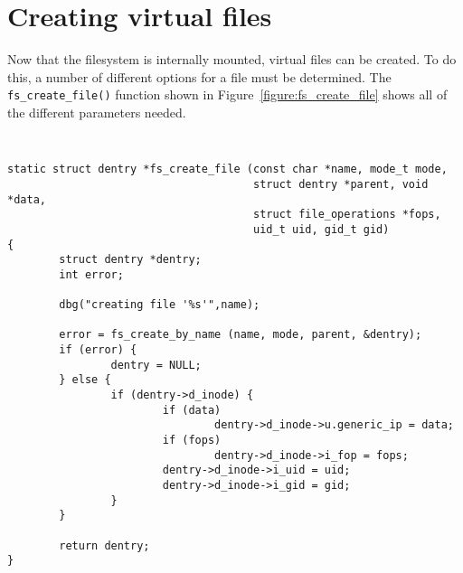 \documentclass[twocolumn]{article}
\begin{document}
\section{Creating virtual files}

Now that the filesystem is internally mounted, virtual files can be
created.  To do this, a number of different options for a file must be
determined.  The {\tt fs\_create\_file()} function shown in
Figure~\ref{figure:fs_create_file} shows all of the different parameters
needed.

\begin{figure*}[tb]
{\tt \small
\begin{verbatim}
static struct dentry *fs_create_file (const char *name, mode_t mode,
                                      struct dentry *parent, void *data,
                                      struct file_operations *fops,
                                      uid_t uid, gid_t gid)
{
        struct dentry *dentry;
        int error;

        dbg("creating file '%s'",name);

        error = fs_create_by_name (name, mode, parent, &dentry);
        if (error) {
                dentry = NULL;
        } else {
                if (dentry->d_inode) {
                        if (data)
                                dentry->d_inode->u.generic_ip = data;
                        if (fops)
                                dentry->d_inode->i_fop = fops;
                        dentry->d_inode->i_uid = uid;
                        dentry->d_inode->i_gid = gid;
                }
        }

        return dentry;
}
\end{verbatim}
}
\caption{\footnotesize{
{\tt fs\_create\_file} from {\tt drivers/usb/core/inode.c}}}
\label{figure:fs_create_file}
\end{figure*}
\end{document}
